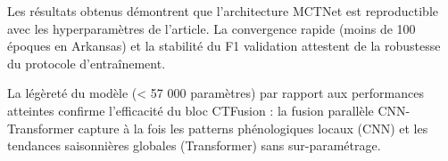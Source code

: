 Les résultats obtenus démontrent que l'architecture MCTNet est reproductible
avec les hyperparamètres de l'article. La convergence rapide (moins de 100
époques en Arkansas) et la stabilité du F1 validation attestent de la
robustesse du protocole d'entraînement.

La légèreté du modèle (< 57 000 paramètres) par rapport aux performances
atteintes confirme l'efficacité du bloc CTFusion : la fusion parallèle
CNN-Transformer capture à la fois les patterns phénologiques locaux (CNN)
et les tendances saisonnières globales (Transformer) sans sur-paramétrage.

\cleardoublepage
